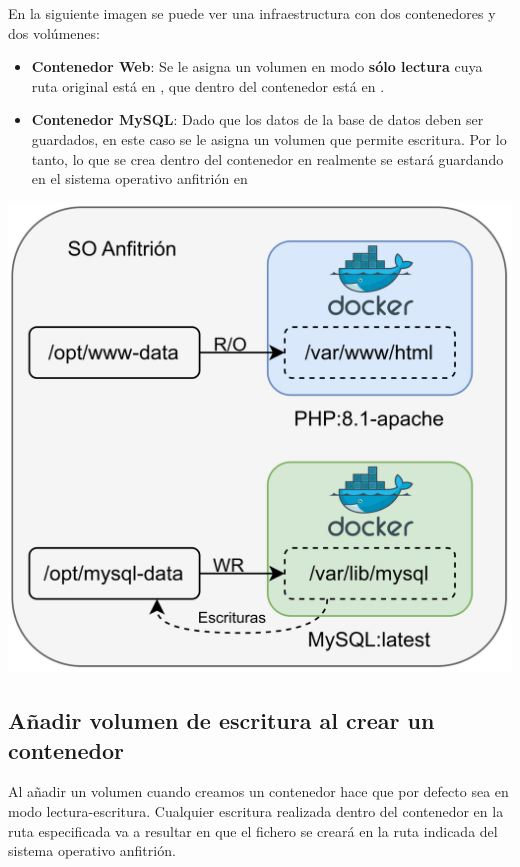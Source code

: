 En la siguiente imagen se puede ver una infraestructura con dos contenedores y dos volúmenes:
\begin{itemize}
    \item \textbf{Contenedor Web}: Se le asigna un volumen en modo \textbf{sólo lectura} cuya ruta original está en , que dentro del contenedor está en .
    \item \textbf{Contenedor MySQL}: Dado que los datos de la base de datos deben ser guardados, en este caso se le asigna un volumen que permite escritura. Por lo tanto, lo que se crea dentro del contenedor en  realmente se estará guardando en el sistema operativo anfitrión en 
\end{itemize}
\begin{center}
    \includegraphics[width=0.65\linewidth]{img/docker/volumes.png}
\end{center}


\subsection{Añadir volumen de escritura al crear un contenedor}

Al añadir un volumen cuando creamos un contenedor hace que por defecto sea en modo lectura-escritura. Cualquier escritura realizada dentro del contenedor en la ruta especificada va a resultar en que el fichero se creará en la ruta indicada del sistema operativo anfitrión.



